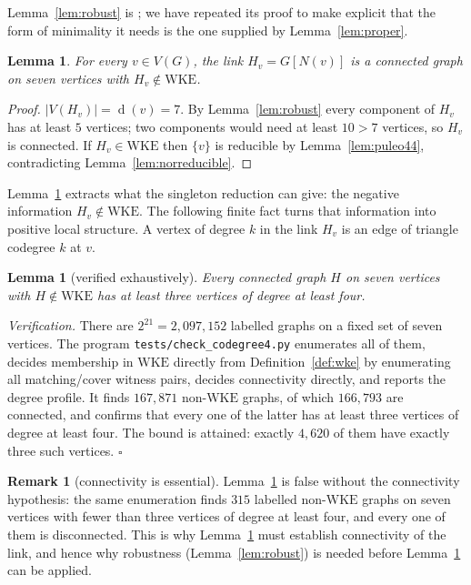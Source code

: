 \documentclass[11pt,a4paper]{amsart}
\theoremstyle{plain}
\newtheorem{lemma}[theorem]{Lemma}
\theoremstyle{definition}
\newtheorem{remark}[theorem]{Remark}
\newcommand{\WKE}{\mathrm{WKE}}
\newcommand{\N}{N}
\newcommand{\dg}{\operatorname{d}}
\begin{document}
Lemma~\ref{lem:robust} is \cite[Lemma 2.6]{Puleo2015}; we have repeated its
proof to make explicit that the form of minimality it needs is the one
supplied by Lemma~\ref{lem:proper}.

\begin{lemma}\label{lem:linkstructure}
For every $v\in V(G)$, the link $H_v=G[\N(v)]$ is a connected graph on seven
vertices with $H_v\notin\WKE$.
\end{lemma}

\begin{proof}
$|V(H_v)|=\dg(v)=7$. By Lemma~\ref{lem:robust} every component of $H_v$ has at
least $5$ vertices; two components would need at least $10>7$ vertices, so
$H_v$ is connected. If $H_v\in\WKE$ then $\{v\}$ is reducible by
Lemma~\ref{lem:puleo44}, contradicting Lemma~\ref{lem:norreducible}.
\end{proof}

Lemma~\ref{lem:linkstructure} extracts what the singleton reduction can give:
the negative information $H_v\notin\WKE$. The following finite fact turns that
information into positive local structure. A vertex of degree $k$ in the link
$H_v$ is an edge of triangle codegree $k$ at $v$.

\begin{lemma}[verified exhaustively]\label{lem:B1}
Every connected graph $H$ on seven vertices with $H\notin\WKE$ has at least
three vertices of degree at least four.
\end{lemma}

\emph{Verification.} There are $2^{21}=2{,}097{,}152$ labelled graphs on a
fixed set of seven vertices. The program \texttt{tests/check\_codegree4.py}
enumerates all of them, decides membership in $\WKE$ directly from
Definition~\ref{def:wke} by enumerating all matching/cover witness pairs,
decides connectivity directly, and reports the degree profile. It finds
$167{,}871$ non-$\WKE$ graphs, of which $166{,}793$ are
connected, and confirms that every one of the latter has at least three
vertices of degree at least four. The bound is attained: exactly $4{,}620$ of
them have exactly three such vertices. \hfill$\square$

\begin{remark}[connectivity is essential]\label{rem:connectivity}
Lemma~\ref{lem:B1} is false without the connectivity hypothesis: the same
enumeration finds $315$ labelled non-$\WKE$ graphs on seven vertices with
fewer than three vertices of degree at least four, and every one of them is
disconnected. This is why Lemma~\ref{lem:linkstructure} must establish
connectivity of the link, and hence why robustness (Lemma~\ref{lem:robust})
is needed before Lemma~\ref{lem:B1} can be applied.
\end{remark}
\end{document}
